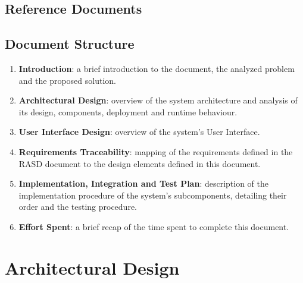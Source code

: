 \documentclass[10pt]{article} %
\begin{document}
\subsection{Reference Documents}
\subsection{Document Structure}
\begin{enumerate}
    \item \textbf{Introduction}: a brief introduction to the document, the analyzed problem and the proposed solution.
    \item \textbf{Architectural Design}: overview of the system architecture and analysis of its design, components, deployment and runtime behaviour.
    \item \textbf{User Interface Design}: overview of the system's User Interface.
    \item \textbf{Requirements Traceability}: mapping of the requirements defined in the RASD document to the design elements defined in this document.
    \item \textbf{Implementation, Integration and Test Plan}: description of the implementation procedure of the system's subcomponents, detailing their order and the testing procedure.
    \item \textbf{Effort Spent}: a brief recap of the time spent to complete this document.
\end{enumerate}
\newpage
\section{Architectural Design}
\end{document}
